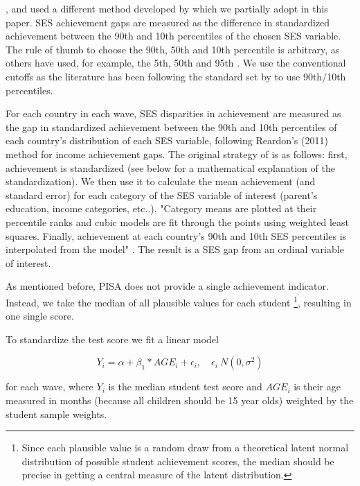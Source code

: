 \documentclass[11pt, a4paper]{article}\usepackage[]{graphicx}\usepackage[]{color}
\begin{document}
\citet{reardon_portilla}, \citet{anna2016} and \citet{anna2016_global} used a different method developed by \citet{reardon2011} which we partially adopt in this paper. SES achievement gaps are measured as the difference in standardized achievement between the 90th and 10th percentiles of the chosen SES variable. The rule of thumb to choose the 90th, 50th and 10th percentile is arbitrary, as others have used, for example, the 5th, 50th and 95th \citep{micklewright}. We use the conventional cutoffs as the literature has been following the standard set by \citet{reardon2011} to use 90th/10th percentiles.

For each country in each wave, SES disparities in achievement are measured as the gap in standardized achievement between the 90th and 10th percentiles of each country’s distribution of each SES variable, following Reardon’s (2011) method for income achievement gaps. The original strategy of \citet{reardon2011} is as follows: first, achievement is standardized (see below for a mathematical explanation of the standardization). We then use it to calculate the mean achievement (and standard error) for each category of the SES variable of interest (parent's education, income categories, etc..). "Category means are plotted at their percentile ranks and cubic models are fit through the points using weighted least squares. Finally, achievement at each country’s 90th and 10th SES percentiles is interpolated from the model" \citep{anna2016_global}. The result is a SES gap from an ordinal variable of interest.

As mentioned before, PISA does not provide a single achievement indicator. Instead, we take the median of all plausible values for each student \footnote{Since each plausible value is a random draw from a theoretical latent normal distribution of possible student achievement scores, the median should be precise in getting a central measure of the latent distribution.}, resulting in one single score.

To standardize the test score we fit a linear model

\begin{equation}
Y_i = \alpha + \beta_1 * AGE_i + \epsilon_i, \quad \epsilon_i ~ N(0, \sigma^2)
\end{equation}

for each wave,  where \begin{math}Y_i\end{math} is the median student test score and \begin{math}AGE_i\end{math} is their age measured in months (because all children should be 15 year olds) weighted by the student sample weights.
\end{document}
